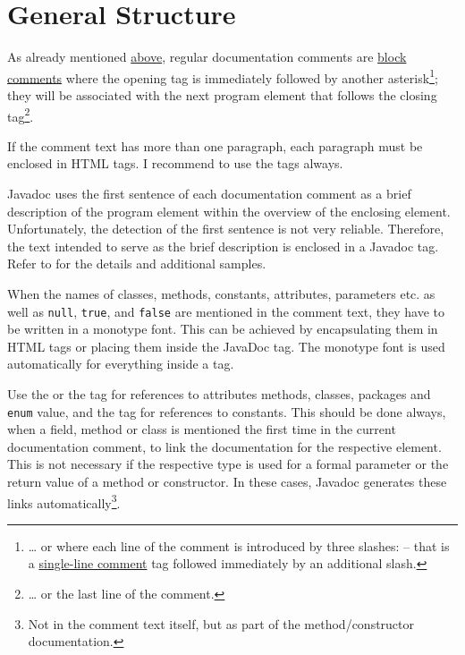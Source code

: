 \section{General Structure}\label{sec:DocCommentsGeneralStructure}
As already mentioned \hyperref[lbl:DocumentationComments]{above}, regular documentation comments are \hyperref[sec:BlockComments]{block comments} where the opening tag is immediately followed by another asterisk\footnote{… or where each line of the comment is introduced by three slashes:  – that is a \hyperref[sec:SingleLineComments]{single-line comment} tag followed immediately by an additional slash.}; they will be associated with the next program element that follows the closing tag\footnote{… or the last line of the comment.}.

If the comment text has more than one paragraph, each paragraph must be enclosed in  HTML tags. I recommend to use the tags always.

Javadoc uses the first sentence of each documentation comment as a brief description of the program element within the overview of the enclosing element. Unfortunately, the detection of the first sentence is not very reliable. Therefore, the text intended to serve as the brief description is enclosed in a  Javadoc tag. Refer to \autocite{ORACLE_DOC_JAVADOC_TAG,DZONE_JAVADOC_SUMMARY} for the details and additional samples.

When the names of classes, methods, constants, attributes, parameters etc. as well as \lstinline|null|, \lstinline|true|, and \lstinline|false| are mentioned in the comment text, they have to be written in a monotype font. This can be achieved by encapsulating them in  HTML tags or placing them inside the JavaDoc  tag. The monotype font is used automatically for everything inside a  tag. 

Use the  or the  tag for references to attributes methods, classes, packages and \lstinline|enum| value, and the  tag for references to constants. This should be done always, when a field, method or class is mentioned the first time in the current documentation comment, to link the documentation for the respective element. This is not necessary if the respective type is used for a formal parameter or the return value of a method or constructor. In these cases, Javadoc generates these links automatically\footnote{Not in the comment text itself, but as part of the method/constructor documentation.}.

